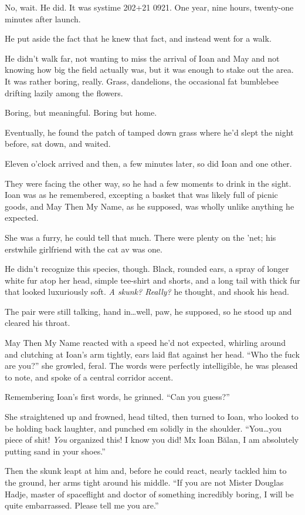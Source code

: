 No, wait. He did. It was systime 202+21 0921. One year, nine hours, twenty-one minutes after launch.

He put aside the fact that he knew that fact, and instead went for a walk.

He didn't walk far, not wanting to miss the arrival of Ioan and May and not knowing how big the field actually was, but it was enough to stake out the area. It was rather boring, really. Grass, dandelions, the occasional fat bumblebee drifting lazily among the flowers.

Boring, but meaningful. Boring but home.

Eventually, he found the patch of tamped down grass where he'd slept the night before, sat down, and waited.

Eleven o'clock arrived and then, a few minutes later, so did Ioan and one other.

They were facing the other way, so he had a few moments to drink in the sight. Ioan was as he remembered, excepting a basket that was likely full of picnic goods, and May Then My Name, as he supposed, was wholly unlike anything he expected.

She was a furry, he could tell that much. There were plenty on the 'net; his erstwhile girlfriend with the cat av was one.

He didn't recognize this species, though. Black, rounded ears, a spray of longer white fur atop her head, simple tee-shirt and shorts, and a long tail with thick fur that looked luxuriously soft. \emph{A skunk? Really?} he thought, and shook his head.

The pair were still talking, hand in\ldots well, paw, he supposed, so he stood up and cleared his throat.

May Then My Name reacted with a speed he'd not expected, whirling around and clutching at Ioan's arm tightly, ears laid flat against her head. ``Who the fuck are you?'' she growled, feral. The words were perfectly intelligible, he was pleased to note, and spoke of a central corridor accent.

Remembering Ioan's first words, he grinned. ``Can you guess?''

She straightened up and frowned, head tilted, then turned to Ioan, who looked to be holding back laughter, and punched em solidly in the shoulder. ``You\ldots you piece of shit! \emph{You} organized this! I know you did! Mx Ioan Bălan, I am absolutely putting sand in your shoes.''

Then the skunk leapt at him and, before he could react, nearly tackled him to the ground, her arms tight around his middle. ``If you are not Mister Douglas Hadje, master of spaceflight and doctor of something incredibly boring, I will be quite embarrassed. Please tell me you are.''

